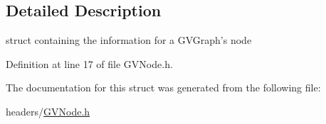 \subsection{Detailed Description}
struct containing the information for a G\+V\+Graph's node 

Definition at line 17 of file G\+V\+Node.\+h.



The documentation for this struct was generated from the following file\+:\begin{DoxyCompactItemize}
\item 
headers/\hyperlink{GVNode_8h}{G\+V\+Node.\+h}\end{DoxyCompactItemize}
